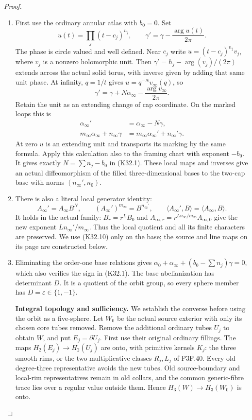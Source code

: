 \begin{proof}
\begin{enumerate}[label=\arabic*.]
\item First use the ordinary annular atlas with $b_0=0$. Set
\[
 u(t)=\prod_j(t-c_j)^{n_j},\qquad
 \gamma'=\gamma-\frac{\arg u(t)}{2\pi}.                 \tag{K32.10}
\]
The phase is circle valued and well defined. Near $c_j$
write $u=(t-c_j)^{n_j}v_j$, where $v_j$ is a nonzero
holomorphic unit. Then
$\gamma'=h_j-\arg(v_j)/(2\pi)$ extends across the actual
solid torus, with inverse given by adding that same unit
phase. At infinity, $q=1/t$ gives $u=q^{-N}v_\infty(q)$,
so
\[
 \gamma'=\gamma+N\alpha_\infty
                         -\frac{\arg v_\infty}{2\pi}.
\]
Retain the unit as an extending change of cap coordinate.
On the marked loops this is
\[
 \begin{split}
 \alpha_\infty'&=\alpha_\infty-N\gamma,\\
 m_\infty\alpha_\infty+n_\infty\gamma
  &=m_\infty\alpha_\infty'+n_\infty'\gamma.             
 \end{split}\tag{K32.11}
\]
At zero $u$ is an extending unit and transports its
marking by the same formula. Apply this calculation
also to the framing chart with exponent $-b_0$.
It gives exactly $N=\sum n_j-b_0$ in (K32.1).
These local maps and inverses give an actual diffeomorphism
of the filled three-dimensional bases to the two-cap base
with norms $(n_\infty',n_0)$.

\item There is also a literal local generator identity:
\[
 A_\infty'=A_\infty B^N,\qquad
 (A_\infty')^{m_\infty}=B^{n_\infty'},\qquad
 \langle A_\infty',B\rangle=\langle A_\infty,B\rangle.
                                                               \tag{K32.12}
\]
It holds in the actual family:
$B_r=r^LB_0$ and
$A_{\infty,r}=r^{Ln_\infty/m_\infty}A_{\infty,0}$
give the new exponent $Ln_\infty'/m_\infty$.
Thus the local quotient and all its finite characters
are preserved. We use (K32.10) only on the base;
the source and line maps on its page are constructed below.

\item Eliminating the order-one base relations gives
$\alpha_0+\alpha_\infty+(b_0-\sum n_j)\gamma=0$,
which also verifies the sign in (K32.1).
The base abelianization has determinant $D$. It is a
quotient of the orbit group, so every sphere member has
$D=\varepsilon\in\{1,-1\}$.

\par\medskip\noindent\textbf{Integral topology and sufficiency.}
We establish the converse before using the orbit as a
five-sphere. Let $W_0$ be the actual source exterior with
only its chosen core tubes removed. Remove the additional
ordinary tubes $U_j$ to obtain $W$, and put
$E_j=\partial U_j$. First use their original ordinary
fillings. The maps $H_2(E_j)\to H_2(U_j)$ are onto, with
primitive kernels $K_j$: the three smooth rims, or the
two multiplicative classes $R_j,L_j$ of P3F.40.
Every old degree-three representative avoids the new
tubes. Old source-boundary and local-rim representatives
remain in old collars, and the common generic-fibre
trace lies over a regular value outside them. Hence
$H_3(W)\to H_3(W_0)$ is onto.


\end{enumerate}
\end{proof}
